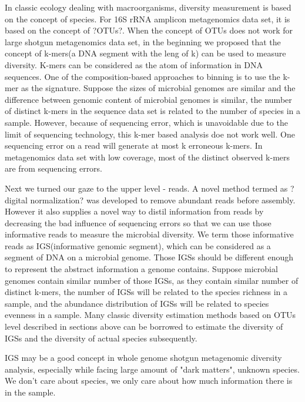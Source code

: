 \documentclass{article}
\begin{document}
In classic ecology dealing with macroorganisms, diversity measurement is based on the concept of species. For 16S rRNA amplicon metagenomics data set, it is based on the concept of ?OTUs?. When the concept of OTUs does not work for large shotgun metagenomics data set, in the beginning we proposed that the concept of k-mers(a DNA segment with the leng of k) can be used to measure diversity. K-mers can be considered as the atom of information in DNA sequences. One of the composition-based approaches to binning is to use the k-mer as the signature. Suppose the sizes of microbial genomes are similar and the difference between genomic content of microbial genomes is similar, the number of distinct k-mers in the sequence data set is related to the number of species in a sample. However, because of sequencing error, which is unavoidable due to the limit of sequencing technology, this k-mer based analysis doe not work well. One sequencing error on a read will generate at most k erroneous k-mers. In metagenomics data set with low coverage, most of the distinct observed k-mers are from sequencing errors.




Next we turned our gaze to the upper level - reads. A novel method termed as ?digital normalization? was developed to remove abundant reads before assembly. However it also supplies a novel way to distil information from reads by decreasing the bad influence of sequencing errors so that we can use those informative reads to measure the microbial diversity. We term those informative reads as IGS(informative genomic segment), which can be considered as a segment of DNA on a microbial genome. Those IGSs should be different enough to represent the abstract information a genome contains. Suppose microbial genomes contain similar number of those IGSs, as they contain similar number of distinct k-mers, the number of IGSs will be related to the species richness in a sample, and the abundance distribution of IGSs will be related to species evenness in a sample. Many classic diversity estimation methods based on OTUs level described in sections above can be borrowed to estimate the diversity of IGSs and the diversity of actual species subsequently.

IGS may be a good concept in whole genome shotgun metagenomic diversity analysis, especially while facing large amount of "dark matters", unknown species. We don't care about species, we only care about how much information there is in the sample.
\end{document}
